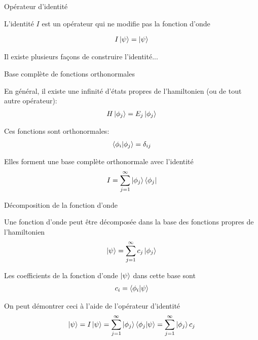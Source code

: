 \documentclass[xcolor=svgnames,t,aspectratio=169,handout]{uqtrcours}
\begin{document}
\begin{frame}{Opérateur d'identité}

L'identité $I$ est un opérateur qui ne modifie pas la fonction d'onde

\bigskip

\begin{align}
  I \ket{\psi} = \ket{\psi}
\end{align}

\bigskip

Il existe plusieurs façons de construire l'identité...

\end{frame}




\begin{frame}{Base complète de fonctions orthonormales}

%
En général, il existe une infinité d'états propres
  de l'hamiltonien (ou de tout autre opérateur):
\begin{align}
  H \ket{\phi_j} = E_j \ket{\phi_j}
\end{align}

Ces fonctions sont orthonormales:
\begin{align}
  \braket{\phi_i \vert \phi_j} = \delta_{ij}
\end{align}

Elles forment une base complète orthonormale
  avec l'identité
\begin{align}
  I = \sum_{j=1}^{\infty} \ket{\phi_j} \bra{\phi_j}
\end{align}

\end{frame}



\begin{frame}{Décomposition de la fonction d'onde}

Une fonction d'onde peut être décomposée
  dans la base des fonctions propres de l'hamiltonien
\begin{align}
  \ket{\psi} = \sum_{j=1}^{\infty} c_j \ket{\phi_j}
\end{align}

Les coefficients de la fonction d'onde $\ket{\psi}$
  dans cette base sont
\begin{align}
  c_i = \braket{\phi_i \vert \psi}
\end{align}

On peut démontrer ceci à l'aide de l'opérateur d'identité
\begin{align}
  \ket{\psi}
  = I \ket{\psi}
  = \sum_{j=1}^{\infty} \ket{\phi_j}\braket{\phi_j \vert \psi}
  = \sum_{j=1}^{\infty} \ket{\phi_j} c_j
\end{align}

\end{frame}
\end{document}

